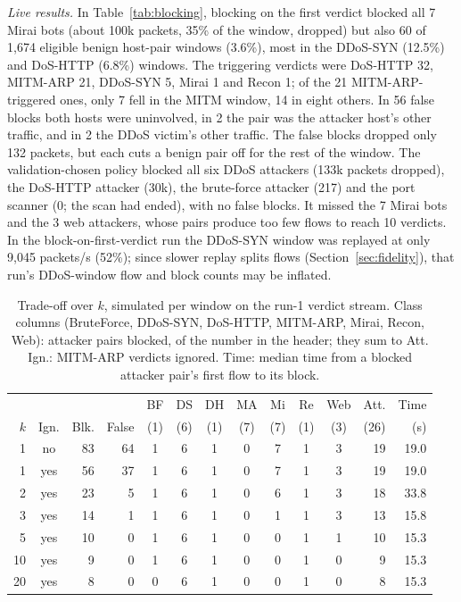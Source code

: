 \emph{Live results.} In Table~\ref{tab:blocking}, blocking on the first verdict blocked all 7 Mirai bots (about 100k packets, 35\% of the window, dropped) but also 60 of 1,674 eligible benign host-pair windows (3.6\%), most in the DDoS-SYN (12.5\%) and DoS-HTTP (6.8\%) windows. The triggering verdicts were DoS-HTTP 32, MITM-ARP 21, DDoS-SYN 5, Mirai 1 and Recon 1; of the 21 MITM-ARP-triggered ones, only 7 fell in the MITM window, 14 in eight others. In 56 false blocks both hosts were uninvolved, in 2 the pair was the attacker host's other traffic, and in 2 the DDoS victim's other traffic. The false blocks dropped only 132 packets, but each cuts a benign pair off for the rest of the window. The validation-chosen policy blocked all six DDoS attackers (133k packets dropped), the DoS-HTTP attacker (30k), the brute-force attacker (217) and the port scanner (0; the scan had ended), with no false blocks. It missed the 7 Mirai bots and the 3 web attackers, whose pairs produce too few flows to reach 10 verdicts. In the block-on-first-verdict run the DDoS-SYN window was replayed at only 9,045 packets/s (52\%); since slower replay splits flows (Section~\ref{sec:fidelity}), that run's DDoS-window flow and block counts may be inflated.

\begin{table}[t]
\centering
\caption{Trade-off over $k$, simulated per window on the run-1 verdict stream. Class columns (BruteForce, DDoS-SYN, DoS-HTTP, MITM-ARP, Mirai, Recon, Web): attacker pairs blocked, of the number in the header; they sum to Att. Ign.: MITM-ARP verdicts ignored. Time: median time from a blocked attacker pair's first flow to its block.}
\label{tab:kcurve}
\footnotesize
\setlength{\tabcolsep}{2.4pt}
\begin{tabular}{rcrrcccccccrr}
\hline
 & & & & BF & DS & DH & MA & Mi & Re & Web & Att. & Time \\
$k$ & Ign. & Blk. & False & (1) & (6) & (1) & (7) & (7) & (1) & (3) & (26) & (s) \\
\hline
1  & no  & 83 & 64 & 1 & 6 & 1 & 0 & 7 & 1 & 3 & 19 & 19.0 \\
1  & yes & 56 & 37 & 1 & 6 & 1 & 0 & 7 & 1 & 3 & 19 & 19.0 \\
2  & yes & 23 &  5 & 1 & 6 & 1 & 0 & 6 & 1 & 3 & 18 & 33.8 \\
3  & yes & 14 &  1 & 1 & 6 & 1 & 0 & 1 & 1 & 3 & 13 & 15.8 \\
5  & yes & 10 &  0 & 1 & 6 & 1 & 0 & 0 & 1 & 1 & 10 & 15.3 \\
10 & yes &  9 &  0 & 1 & 6 & 1 & 0 & 0 & 1 & 0 &  9 & 15.3 \\
20 & yes &  8 &  0 & 0 & 6 & 1 & 0 & 0 & 1 & 0 &  8 & 15.3 \\
\hline
\end{tabular}
\end{table}

